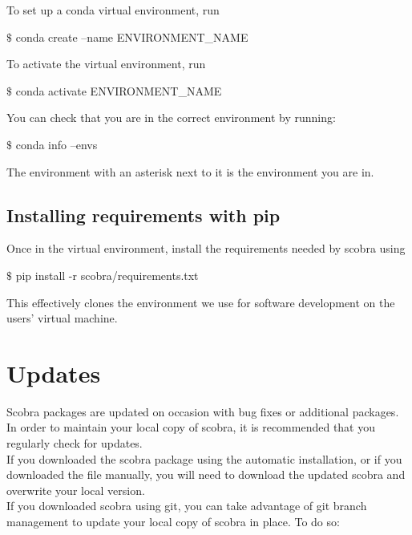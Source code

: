 To set up a conda virtual environment, run 
\begin{framed}
$\$$ conda create --name ENVIRONMENT\_NAME
\end{framed}

To activate the virtual environment, run
\begin{framed}
$\$$ conda activate ENVIRONMENT\_NAME
\end{framed}

You can check that you are in the correct environment by running: 
\begin{framed}
$\$$ conda info --envs 
\end{framed}

The environment with an asterisk next to it is the environment you are in.\\

\subsection{Installing requirements with pip}

Once in the virtual environment, install the requirements needed by scobra using \\

\begin{framed}
$\$$ pip install -r scobra/requirements.txt 
\end{framed}

This effectively clones the environment we use for software development on the users' virtual machine. 


\section{Updates}

Scobra packages are updated on occasion with bug fixes or additional packages. In order to maintain your local copy of scobra, it is recommended that you regularly check for updates.\\

If you downloaded the scobra package using the automatic installation, or if you downloaded the file manually, you will need to download the updated scobra and overwrite your local version.\\

If you downloaded scobra using git, you can take advantage of git branch management to update your local copy of scobra in place. To do so:

